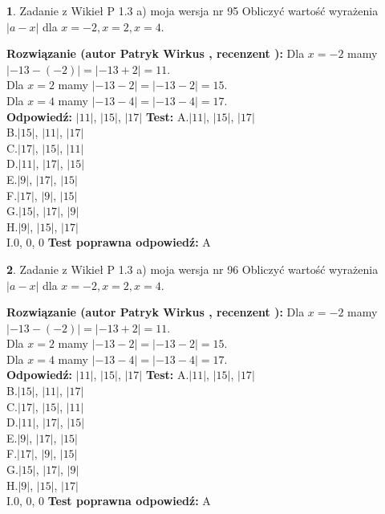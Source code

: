 \documentclass[12pt, a4paper]{article}
\theoremstyle{definition} %
\newtheorem{zad}{}
\newcommand{\zadStart}[1]{\begin{zad}#1\newline}
\newcommand{\zadStop}{\end{zad}}
\newcommand{\rozwStart}[2]{\noindent \textbf{Rozwiązanie (autor #1 , recenzent #2): }\newline}
\newcommand{\rozwStop}{\newline}
\newcommand{\odpStart}{\noindent \textbf{Odpowiedź:}\newline}
\newcommand{\odpStop}{\newline}
\newcommand{\testStart}{\noindent \textbf{Test:}\newline}
\newcommand{\testStop}{\newline}
\newcommand{\kluczStart}{\noindent \textbf{Test poprawna odpowiedź:}\newline}
\newcommand{\kluczStop}{\newline}
\begin{document}
\zadStart{Zadanie z Wikieł P 1.3 a) moja wersja nr 95}
Obliczyć wartość wyrażenia $|a - x|$ dla $x=-2,x=2,x=4$.
\zadStop
\rozwStart{Patryk Wirkus}{}
Dla $x = -2$ mamy $|-13 - (-2)| = |-13 + 2| = 11$.\\
Dla $x = 2$ mamy $|-13 - 2| = |-13 - 2| = 15$.\\
Dla $x = 4$ mamy $|-13 - 4| = |-13 - 4| = 17$.\\
\rozwStop
\odpStart
$|11|$, $|15|$, $|17|$
\odpStop
\testStart
A.$|11|$, $|15|$, $|17|$\\
B.$|15|$, $|11|$, $|17|$\\
C.$|17|$, $|15|$, $|11|$\\
D.$|11|$, $|17|$, $|15|$\\
E.$|9|$, $|17|$, $|15|$\\
F.$|17|$, $|9|$, $|15|$\\
G.$|15|$, $|17|$, $|9|$\\
H.$|9|$, $|15|$, $|17|$\\
I.$0$, $0$, $0$
\testStop
\kluczStart
A
\kluczStop



\zadStart{Zadanie z Wikieł P 1.3 a) moja wersja nr 96}
Obliczyć wartość wyrażenia $|a - x|$ dla $x=-2,x=2,x=4$.
\zadStop
\rozwStart{Patryk Wirkus}{}
Dla $x = -2$ mamy $|-13 - (-2)| = |-13 + 2| = 11$.\\
Dla $x = 2$ mamy $|-13 - 2| = |-13 - 2| = 15$.\\
Dla $x = 4$ mamy $|-13 - 4| = |-13 - 4| = 17$.\\
\rozwStop
\odpStart
$|11|$, $|15|$, $|17|$
\odpStop
\testStart
A.$|11|$, $|15|$, $|17|$\\
B.$|15|$, $|11|$, $|17|$\\
C.$|17|$, $|15|$, $|11|$\\
D.$|11|$, $|17|$, $|15|$\\
E.$|9|$, $|17|$, $|15|$\\
F.$|17|$, $|9|$, $|15|$\\
G.$|15|$, $|17|$, $|9|$\\
H.$|9|$, $|15|$, $|17|$\\
I.$0$, $0$, $0$
\testStop
\kluczStart
A
\kluczStop
\end{document}

